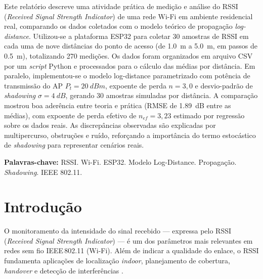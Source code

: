 \documentclass[
  12pt,
  a4paper,
  oneside,
  brazil,
  chapter=TITLE,
  section=TITLE,
]{abntex2}
\begin{document}
\begin{resumo}
Este relat\'orio descreve uma atividade pr\'atica de medi\c{c}\~ao e an\'alise
do RSSI (\textit{Received Signal Strength Indicator}) de uma rede Wi-Fi em
ambiente residencial real, comparando os dados coletados com o modelo te\'orico
de propaga\c{c}\~ao \textit{log-distance}. Utilizou-se a plataforma ESP32 para
coletar 30 amostras de RSSI em cada uma de nove dist\^ancias do ponto de acesso
(de \SI{1.0}{\meter} a \SI{5.0}{\meter}, em passos de \SI{0.5}{\meter}),
totalizando 270 medi\c{c}\~oes. Os dados foram organizados em arquivo CSV por um
\textit{script} Python e processados para o c\'alculo das m\'edias por
dist\^ancia. Em paralelo, implementou-se o modelo log-distance parametrizado com
pot\^encia de transmiss\~ao do AP $P_t = \SI{20}{dBm}$, expoente de perda
$n = 3{,}0$ e desvio-padr\~ao de \textit{shadowing} $\sigma = \SI{4}{dB}$,
gerando 30 amostras simuladas por dist\^ancia. A compara\c{c}\~ao mostrou boa
ader\^encia entre teoria e pr\'atica (RMSE de \SI{1.89}{dB} entre as m\'edias),
com expoente de perda efetivo de $n_{ef} = 3{,}23$ estimado por regress\~ao
sobre os dados reais. As discrep\^ancias observadas s\~ao explicadas por
multipercurso, obstru\c{c}\~oes e ru\'ido, refor\c{c}ando a import\^ancia do
termo estoc\'astico de \textit{shadowing} para representar cen\'arios reais.

\vspace{\onelineskip}
\noindent\textbf{Palavras-chave:} RSSI. Wi-Fi. ESP32. Modelo Log-Distance.
Propaga\c{c}\~ao. \textit{Shadowing}. IEEE 802.11.
\end{resumo}

\tableofcontents*
\cleardoublepage

\textual

\chapter{Introdu\c{c}\~ao}

O monitoramento da intensidade do sinal recebido --- expressa pelo RSSI
(\textit{Received Signal Strength Indicator}) --- \'e um dos par\^ametros mais
relevantes em redes sem fio IEEE\,802.11 (Wi-Fi). Al\'em de indicar a qualidade
do enlace, o RSSI fundamenta aplica\c{c}\~oes de localiza\c{c}\~ao
\textit{indoor}, planejamento de cobertura, \textit{handover} e detec\c{c}\~ao
de interfer\^encias \cite{bahl2000radar}.
\end{document}
